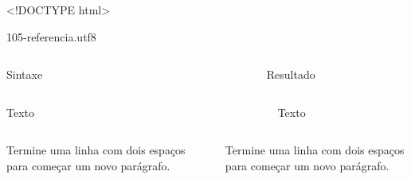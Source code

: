 \documentclass[
]{book}
\begin{document}
\textless!DOCTYPE html\textgreater{}

105-referencia.utf8

\hypertarget{header}{}
\begin{fluid-row}

\end{fluid-row}

\begin{columns}

\begin{column}

Sintaxe

\end{column}

\begin{column}

~

\end{column}

\begin{column}

Resultado

\end{column}

\end{columns}

\begin{columns}

\begin{column}

Texto

\end{column}

\begin{column}

~

\end{column}

\begin{column}

Texto

\end{column}

\end{columns}

\begin{columns}

\begin{column}

Termine uma linha com dois espaços para
começar um novo parágrafo.

\end{column}

\begin{column}

~

\end{column}

\begin{column}

Termine uma linha com dois espaços para começar um novo parágrafo.

\end{column}

\end{columns}
\end{document}
